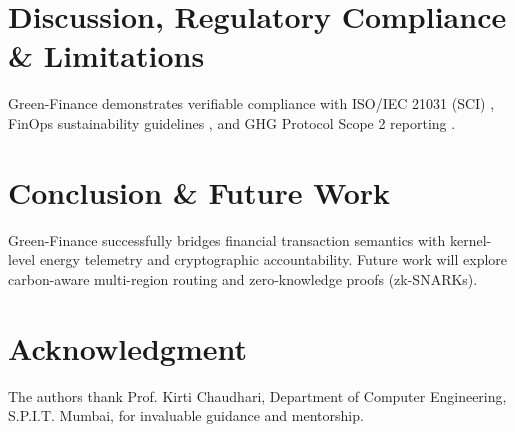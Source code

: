 \documentclass[conference]{IEEEtran}
\begin{document}
\section{Discussion, Regulatory Compliance \& Limitations}
Green-Finance demonstrates verifiable compliance with ISO/IEC 21031 (SCI) \cite{iso21031}, FinOps sustainability guidelines \cite{finops2024}, and GHG Protocol Scope 2 reporting \cite{ghg2015}.

\section{Conclusion \& Future Work}
Green-Finance successfully bridges financial transaction semantics with kernel-level energy telemetry and cryptographic accountability. Future work will explore carbon-aware multi-region routing and zero-knowledge proofs (zk-SNARKs).

\section*{Acknowledgment}
The authors thank Prof. Kirti Chaudhari, Department of Computer Engineering, S.P.I.T. Mumbai, for invaluable guidance and mentorship.
\end{document}
